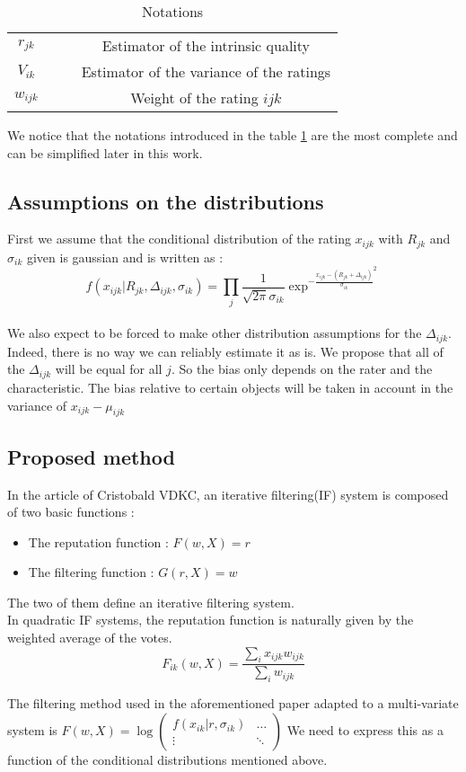 \begin{table}
\begin{tabular}{|c|c|c|c|}
$r_{jk}$ & & & \parbox[t]{5cm}{Estimator of the intrinsic quality}\\
$V_{ik}$ & & & \parbox[t]{5cm}{Estimator of the variance of the ratings}\\

$w_{ijk}$ & & & \parbox[t]{5cm}{Weight of the rating $ijk$}\\
\hline 

\end{tabular} 
\caption{Notations}\label{table:notation}
\end{table}
We notice that the notations introduced in the table \ref{table:notation} are the most complete and can be simplified later in this work.
\subsection{Assumptions on the distributions}
First we assume that the conditional distribution of the rating $x_{ijk}$ with $R_{jk}$ and $\sigma_{ik}$ given is gaussian and is written as : 
$$ f(x_{ijk}|R_{jk},\Delta_{ijk},\sigma_{ik}) = \prod_j \frac{1}{\sqrt{2 \pi} \sigma_{ik}} \exp^{-\frac{x_{ijk}-(R_{jk}+\Delta_{ijk})}{\sigma_{ik}}^2}$$\\
We also expect to be forced to make other distribution assumptions for the $\Delta_{ijk}$. Indeed, there is no way we can reliably estimate it as is. We propose that all of the $\Delta_{ijk}$ will be equal for all $j$. So the bias only depends on  the rater and the characteristic. The bias relative to certain objects will be taken in account in the variance of $x_{ijk}-\mu_{ijk}$

\subsection*{Proposed method}
In the article of Cristobald VDKC, an iterative filtering(IF) system is composed of two basic functions : 
\begin{itemize}
\item The reputation function : $F(w,X)=r$
\item The filtering function : $G(r,X)=w$
\end{itemize}
The two of them define an iterative filtering system.\\
In quadratic IF systems, the reputation function is naturally given by the weighted average of the votes.
$$F_{ik}(w,X) = \frac{\sum_{i}x_{ijk}w_{ijk}}{\sum_i w_{ijk}}$$

The filtering method used in the aforementioned paper adapted to a multi-variate system is $F(w,X) = \log \begin{pmatrix}
f(x_{ik}|r,\sigma_{ik}) & \hdots \\
\vdots & \ddots 
\end{pmatrix}$
We need to express this as a function of the conditional distributions mentioned above.


